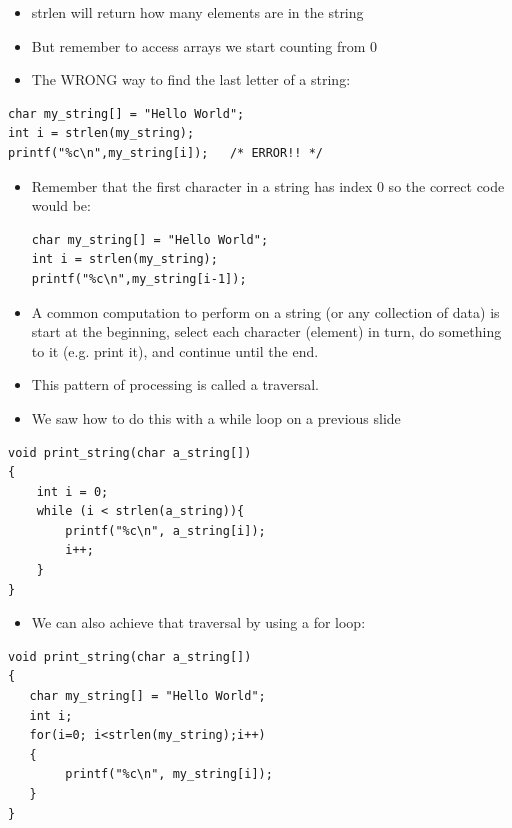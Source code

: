 \documentclass{beamer}
\begin{document}
\begin{frame}[fragile]
\begin{itemize}
\item strlen will return how many elements are in the string
\item But remember to access arrays we start counting from 0
\item The WRONG way to find the last letter of a string:
\end{itemize}
\begin{block}{}
\begin{lstlisting}
char my_string[] = "Hello World";
int i = strlen(my_string);
printf("%c\n",my_string[i]);   /* ERROR!! */
\end{lstlisting}
\end{block}
\begin{itemize}
\item Remember that the first character in a string has index 0 so the correct code would be:
\begin{block}{}
\begin{lstlisting}
char my_string[] = "Hello World";
int i = strlen(my_string);
printf("%c\n",my_string[i-1]); 
\end{lstlisting}
\end{block} 
\end{itemize}
\end{frame}

\begin{frame}[fragile]
\begin{itemize}
\item A common computation to perform on a string (or any collection of data) is start at the beginning, select each character (element) in turn, do something to it (e.g. print it), and continue until the end.
\item This pattern of processing is called a traversal.
\item We saw how to do this with a while loop on a previous slide
\end{itemize}
\begin{block}{}
\begin{lstlisting}
void print_string(char a_string[])
{
    int i = 0;
    while (i < strlen(a_string)){
        printf("%c\n", a_string[i]);
        i++;
    }
}
\end{lstlisting}
\end{block}
\end{frame}

\begin{frame}[fragile]
\begin{itemize}
\item We can also achieve that traversal by using a for loop: 
\end{itemize}

\begin{block}{}
\begin{lstlisting}
void print_string(char a_string[])
{
   char my_string[] = "Hello World";
   int i;
   for(i=0; i<strlen(my_string);i++)
   {
        printf("%c\n", my_string[i]);
   } 
}
\end{lstlisting}
\end{block}
\end{frame}
\end{document}
